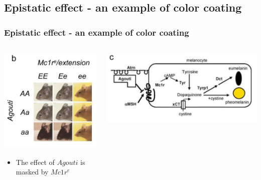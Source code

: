 \documentclass{beamer}
\begin{document}
  \subsection{Epistatic effect - an example of color coating}
  \begin{frame}
  \frametitle{Epistatic effect - an example of color coating \cite{phillips2008epistasis}}
    \begin{columns}
      \begin{column}{.44\textwidth}
        \centering
        \includegraphics[width=\linewidth]{epi}
        \label{fig:epi}
        \begin{itemize}
          \item The effect of $Agouti$ is masked by $Mc1r^e$
        \end{itemize}
      \end{column}
      \begin{column}{.54\textwidth}
        \centering
        \includegraphics[width=\linewidth]{epi2}

\end{column}
\end{columns}
\end{frame}
\end{document}
